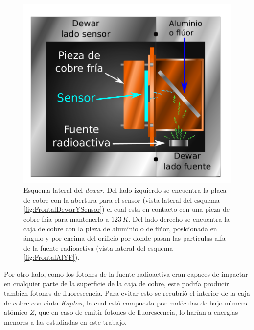 \begin{figure}%
    \centering
    \includegraphics[scale=0.7]{Figs/LateralDewar.pdf}
    \caption{Esquema lateral del \textit{dewar}. Del lado izquierdo se encuentra la placa de cobre con la abertura para el sensor (vista lateral del esquema \ref{fig:FrontalDewarYSensor}) el cual está en contacto con una pieza de cobre fría para mantenerlo a $123\,\si{K}$. Del lado derecho se encuentra la caja de cobre con la pieza de aluminio o de flúor, posicionada en ángulo y por encima del orificio por donde pasan las partículas alfa de la fuente radioactiva (vista lateral del esquema \ref{fig:FrontalAlYF}).}
    \label{fig:LateralDewar}
\end{figure}
Por otro lado, como los fotones de la fuente radioactiva eran capaces de impactar en cualquier parte de la superficie de la caja de cobre, este podría producir también fotones de fluorescencia. Para evitar esto se recubrió el interior de la caja de cobre con cinta \textit{Kapton}, la cual está compuesta por moléculas de bajo número atómico $Z$, que en caso de emitir fotones de fluorescencia, lo harían a energías menores a las estudiadas en este trabajo.


